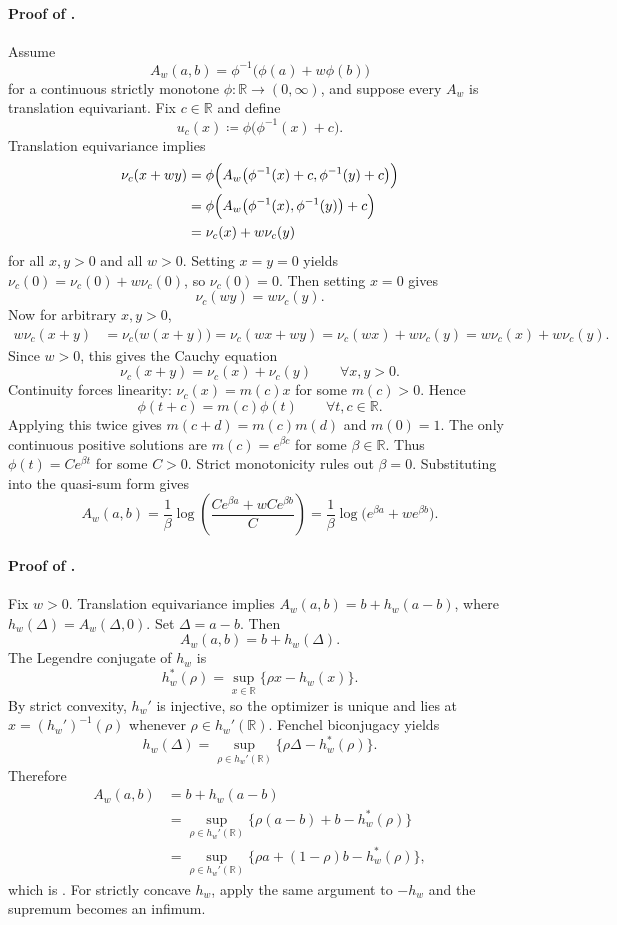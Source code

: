 \documentclass{article}
\theoremstyle{remark}
\newcommand{\R}{\mathbb{R}}
\newcommand{\defeq}{\coloneqq}
\begin{document}
\paragraph{Proof of .}
Assume
\[
A_w(a,b)=\phi^{-1}\!\bigl(\phi(a)+w\phi(b)\bigr)
\]
for a continuous strictly monotone $\phi:\R\to(0,\infty)$, and suppose every $A_w$ is translation equivariant.
Fix $c\in\R$ and define
\[
u_c(x)\defeq \phi\bigl(\phi^{-1}(x)+c\bigr).
\]
Translation equivariance implies
\begin{align*}
\nu_c(x+w y)
&=\phi\Bigl(A_w\bigl(\phi^{-1}(x)+c,\phi^{-1}(y)+c\bigr)\Bigr)\\
&=\phi\Bigl(A_w\bigl(\phi^{-1}(x),\phi^{-1}(y)\bigr)+c\Bigr)\\
&=\nu_c(x)+w\nu_c(y)
\end{align*}
for all $x,y>0$ and all $w>0$.
Setting $x=y=0$ yields $\nu_c(0)=\nu_c(0)+w\nu_c(0)$, so $\nu_c(0)=0$.
Then setting $x=0$ gives
\[
\nu_c(wy)=w\nu_c(y).
\]
Now for arbitrary $x,y>0$,
\begin{align*}
w\nu_c(x+y)
&=\nu_c\bigl(w(x+y)\bigr)
 = \nu_c(wx+wy)
 = \nu_c(wx)+w\nu_c(y)
 = w\nu_c(x)+w\nu_c(y).
\end{align*}
Since $w>0$, this gives the Cauchy equation
\[
\nu_c(x+y)=\nu_c(x)+\nu_c(y)
\qquad \forall x,y>0.
\]
Continuity forces linearity: $\nu_c(x)=m(c)x$ for some $m(c)>0$.
Hence
\[
\phi(t+c)=m(c)\phi(t)
\qquad \forall t,c\in\R.
\]
Applying this twice gives $m(c+d)=m(c)m(d)$ and $m(0)=1$.
The only continuous positive solutions are $m(c)=e^{\beta c}$ for some $\beta\in\R$.
Thus $\phi(t)=Ce^{\beta t}$ for some $C>0$.
Strict monotonicity rules out $\beta=0$.
Substituting into the quasi-sum form gives
\[
A_w(a,b)=\frac{1}{\beta}\log\!\left(\frac{Ce^{\beta a}+wCe^{\beta b}}{C}\right)=\frac{1}{\beta}\log\!\bigl(e^{\beta a}+w e^{\beta b}\bigr).
\]

\paragraph{Proof of .}
Fix $w>0$.
Translation equivariance implies $A_w(a,b)=b+h_w(a-b)$, where $h_w(\Delta)=A_w(\Delta,0)$.
Set $\Delta=a-b$.
Then
\[
A_w(a,b)=b+h_w(\Delta).
\]
The Legendre conjugate of $h_w$ is
\[
h_w^*(\rho)=\sup_{x\in\R}\{\rho x-h_w(x)\}.
\]
By strict convexity, $h_w'$ is injective, so the optimizer is unique and lies at $x=(h_w')^{-1}(\rho)$ whenever $\rho\in h_w'(\R)$.
Fenchel biconjugacy yields
\[
h_w(\Delta)=\sup_{\rho\in h_w'(\R)}\{\rho\Delta-h_w^*(\rho)\}.
\]
Therefore
\begin{align*}
A_w(a,b)
&=b+h_w(a-b)\\
&=\sup_{\rho\in h_w'(\R)}\{\rho(a-b)+b-h_w^*(\rho)\}\\
&=\sup_{\rho\in h_w'(\R)}\{\rho a +(1-\rho)b-h_w^*(\rho)\},
\end{align*}
which is .
For strictly concave $h_w$, apply the same argument to $-h_w$ and the supremum becomes an infimum.
\end{document}
